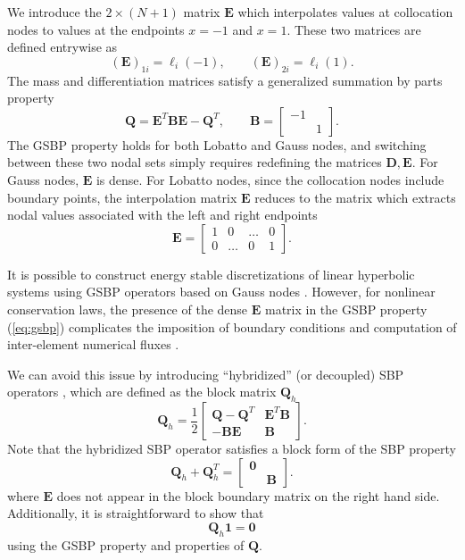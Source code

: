 \documentclass{svjour3}                     %
\newcommand{\LRp}[1]{\left( #1 \right)}
\begin{document}
We introduce the $2\times (N+1)$ matrix $\bm{E}$ which interpolates values at collocation nodes to values at the endpoints $x = -1$ and $x=1$.  These two matrices are defined entrywise as
\[
\LRp{\bm{E}}_{1i} = \ell_i(-1), \qquad  \LRp{\bm{E}}_{2i} = \ell_i(1).
\]
The mass and differentiation matrices satisfy a generalized summation by parts property \cite{fernandez2014generalized}
\begin{equation}
\bm{Q} = \bm{E}^T \bm{B} \bm{E} - \bm{Q}^T, \qquad \bm{B} = \begin{bmatrix}-1 & \\ & 1\end{bmatrix}.
\label{eq:gsbp}
\end{equation}
The GSBP property holds for both Lobatto and Gauss nodes, and switching between these two nodal sets simply requires redefining the matrices $\bm{D}, \bm{E}$.  For Gauss nodes, $\bm{E}$ is dense.  For Lobatto nodes, since the collocation nodes include boundary points, the interpolation matrix $\bm{E}$ reduces to the matrix which extracts nodal values associated with the left and right endpoints
\[
\bm{E} = \begin{bmatrix}
1 & 0 & \ldots & 0\\
0 & \ldots & 0 & 1
\end{bmatrix}.
\]

It is possible to construct energy stable discretizations of linear hyperbolic systems using GSBP operators based on Gauss nodes \cite{fernandez2014generalized}.  However, for nonlinear conservation laws, the presence of the dense $\bm{E}$ matrix in the GSBP property (\ref{eq:gsbp}) complicates the imposition of boundary conditions and computation of inter-element numerical fluxes \cite{crean2018entropy, chan2017discretely, chan2018efficient}.  

We can avoid this issue by introducing ``hybridized'' (or decoupled) SBP operators \cite{chan2017discretely, chenreview}, which are defined as the block matrix $\bm{Q}_h$ \cite{chan2019skew}
\[
\bm{Q}_h = \frac{1}{2}\begin{bmatrix}
\bm{Q}-\bm{Q}^T & \bm{E}^T\bm{B}\\
-\bm{B}\bm{E} & \bm{B}
\end{bmatrix}.
\]
Note that the hybridized SBP operator satisfies a block form of the SBP property
\begin{equation}
\bm{Q}_h + \bm{Q}_h^T = \begin{bmatrix}
\bm{0} & \\
& \bm{B}\end{bmatrix}.
\label{eq:hsbp}
\end{equation}
where $\bm{E}$ does not appear in the block boundary matrix on the right hand side.  Additionally, it is straightforward to show that 
\[
\bm{Q}_h\bm{1} = \bm{0}
\]
using the GSBP property and properties of $\bm{Q}$.  
\end{document}
